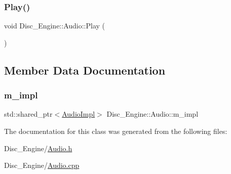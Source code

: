 \mbox{\label{class_disc___engine_1_1_audio_a8c35b6601e9953672cb3430a6a2e48d5}} 
\subsubsection{\texorpdfstring{Play()}{Play()}\hspace{0.1cm}{\footnotesize\ttfamily [2/2]}}
{\footnotesize\ttfamily void Disc\+\_\+\+Engine\+::\+Audio\+::\+Play (\begin{DoxyParamCaption}{ }\end{DoxyParamCaption})}



\subsection{Member Data Documentation}
\mbox{\label{class_disc___engine_1_1_audio_a48cd67333f402e0e3f73e3cf70482f07}} 
\subsubsection{\texorpdfstring{m\+\_\+impl}{m\_impl}}
{\footnotesize\ttfamily std\+::shared\+\_\+ptr$<$\mbox{\hyperlink{struct_disc___engine_1_1_audio_impl}{Audio\+Impl}}$>$ Disc\+\_\+\+Engine\+::\+Audio\+::m\+\_\+impl\hspace{0.3cm}{\ttfamily [private]}}



The documentation for this class was generated from the following files\+:\begin{DoxyCompactItemize}
\item 
Disc\+\_\+\+Engine/\mbox{\hyperlink{_audio_8h}{Audio.\+h}}\item 
Disc\+\_\+\+Engine/\mbox{\hyperlink{_audio_8cpp}{Audio.\+cpp}}\end{DoxyCompactItemize}
